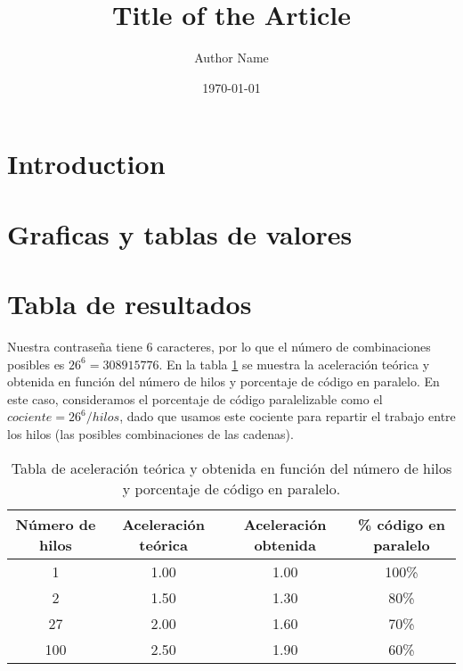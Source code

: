 \documentclass{article}
\title{Title of the Article}
\author{Author Name}
\date{\today}
\begin{document}
\maketitle
\section{Introduction}


\section{Graficas y tablas de valores}
\section{Tabla de resultados}

Nuestra contraseña tiene 6 caracteres, por lo que el número de combinaciones posibles es $26^6 = 308 915 776$. En la tabla \ref{tab:my_label} se muestra la aceleración teórica y obtenida en función del número de hilos y porcentaje de código en paralelo.
En este caso, consideramos el porcentaje de código paralelizable como el $cociente=26^6/hilos$, dado que usamos este cociente para repartir el trabajo entre los hilos (las posibles combinaciones de las cadenas).

\begin{table}[h]
\centering
\begin{tabular}{|c|c|c|c|}
\hline
\textbf{Número de hilos} & \textbf{Aceleración teórica} & \textbf{Aceleración obtenida} & \textbf{\% código en paralelo} \\
\hline
1 & 1.00 & 1.00 & 100\% \\
2 & 1.50 & 1.30 & 80\% \\
27 & 2.00 & 1.60 & 70\% \\
100 & 2.50 & 1.90 & 60\% \\
\hline
\end{tabular}
\caption{Tabla de aceleración teórica y obtenida en función del número de hilos y porcentaje de código en paralelo.}
\label{tab:my_label}
\end{table}
\end{document}
